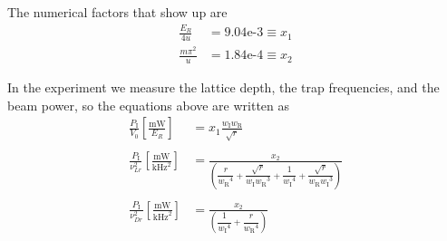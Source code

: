 \documentclass[11pt,letter]{article}
\newcommand{\pin}{\ensuremath{ P_{\text{I}}} }
\newcommand{\win}{\ensuremath{ w_{\text{I}}} }
\newcommand{\wret}{\ensuremath{ w_{\text{R}}} }
\begin{document}
The numerical factors that show up are 
\begin{equation}
\begin{split}
   \frac{E_{R}}{4u } & = 9.04\text{e-3} \equiv x_{1}\\  
   \frac{m\pi^{2}}{u} & = 1.84\text{e-4} \equiv x_{2} 
\end{split}
\end{equation}

In the experiment we measure the lattice depth, the trap frequencies, and the
beam power, so the equations above are written as
\begin{equation}
\begin{split}
 \frac{\pin}{V_{0}} 
 \left[ \frac{\text{mW}}{E_{R}} \right]  
 & = x_{1} \frac{ \win \wret }{ \sqrt{r}}  \\
  & \\ 
 \frac{\pin}{\nu_{Lr} ^{2}} 
 \left[ \frac{\text{mW}}{\text{kHz}^{2}} \right]  
& = \frac{ x_{2} }{ 
   \left( \dfrac{r}{\wret^{4} }
      + \dfrac{ \sqrt{ r }}{ \win \wret^{3}} 
      +  \dfrac{1}{\win^{4}} 
      + \dfrac{ \sqrt{ r }}{ \wret \win^{3} }
   \right)} \\ 
 & \\
 \frac{\pin}{ \nu_{Dr}^{2} }
 \left[ \frac{\text{mW}}{\text{kHz}^{2}} \right]  
 & = \frac{ x_{2} }{
   \left(  
     \dfrac{ 1 }{ \win^{4} } + \dfrac{ r }{ \wret^{4} } 
    \right) } \\
\end{split}
\end{equation}



\end{document}
